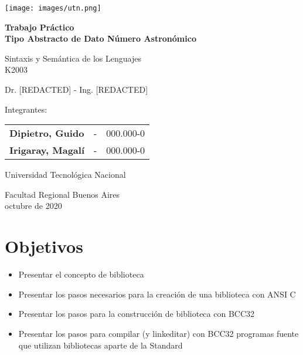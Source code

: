\documentclass[a4paper, 12pt]{article}
\begin{document}
\begin{titlepage}
    \begin{center}
        \vspace*{1cm}
        
        \texttt{[image: images/utn.png]}
        
        \vspace{2cm}
        
        \Huge
        \textbf{Trabajo Práctico}\\
        \textbf{Tipo Abstracto de Dato Número Astronómico}
            
        \vspace{0.5cm}
        \LARGE
        Sintaxis y Semántica de los Lenguajes\\
        K2003
        
        \vspace{1cm}
        
        \large
        Dr. [REDACTED] - Ing. [REDACTED]
            
        \vspace{3cm}
        
        \LARGE
        Integrantes: \\
        
        \vspace{0.5cm}
        
        \large
        \begin{tabular}{lcr}
        \textbf{Dipietro, Guido} &-& 000.000-0\\
        \textbf{Irigaray, Magalí} &-& 000.000-0
        \end{tabular}
            
        \vfill
            
        Universidad Tecnológica Nacional
            
        \Large
        Facultad Regional Buenos Aires\\
        octubre de 2020
            
    \end{center}
\end{titlepage}

\newpage
\tableofcontents
\newpage

\section{Objetivos} \label{objetivos}
\bigbreak
\begin{itemize}
    \item Presentar el concepto de biblioteca
    \item Presentar los pasos necesarios para la creación de una biblioteca con ANSI C
    \item Presentar los pasos para la construcción de biblioteca con BCC32
    \item Presentar los pasos para compilar (y linkeditar) con BCC32 programas fuente que utilizan bibliotecas aparte de la Standard
\end{itemize}
\end{document}
